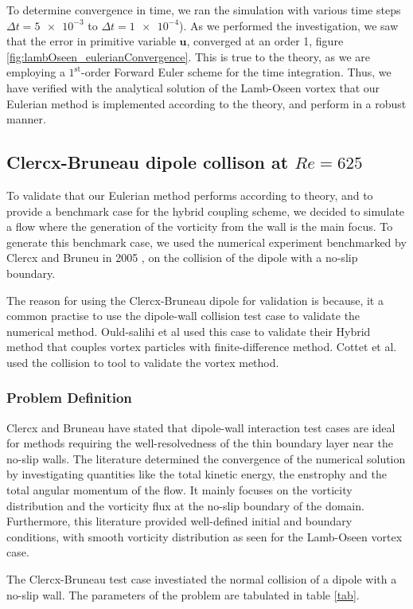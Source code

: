 To determine convergence in time, we ran the simulation with various time steps $\Delta t = \num{5e-3}$ to $\Delta t = \num{1e-4}$). As we performed the investigation, we saw that the error in primitive variable $\mathbf{u}$, converged at an order 1, figure \ref{fig:lambOseen_eulerianConvergence}. This is true to the theory, as we are employing a $1^{\mathrm{st}}$-order Forward Euler scheme for the time integration. Thus, we have verified with the analytical solution of the Lamb-Oseen vortex that our Eulerian method is implemented according to the theory, and perform in a robust manner.
	

\subsection{Clercx-Bruneau dipole collison at $Re=625$}
To validate that our Eulerian method performs according to theory, and to provide a benchmark case for the hybrid coupling scheme, we decided to simulate a flow where the generation of the vorticity from the wall is the main focus. To generate this benchmark case, we used the numerical experiment benchmarked by Clercx and Bruneu in 2005 \cite{}, on  the collision of the dipole with a no-slip boundary. 

The reason for using the Clercx-Bruneau dipole for validation is because, it a common practise to use the dipole-wall collision test case to validate the numerical method. Ould-salihi et al \cite{} used this case to validate their Hybrid method that couples vortex particles with finite-difference method. Cottet et al. \cite{} used the collision to tool to validate the vortex method.
\subsubsection*{Problem Definition}
Clercx and Bruneau have stated that dipole-wall interaction test cases are ideal for methods requiring the well-resolvedness of the thin boundary layer near the no-slip walls. The literature determined the convergence of the numerical solution by investigating quantities like the total kinetic energy, the enstrophy and the total angular momentum of the flow. It mainly focuses on the vorticity distribution and the vorticity flux at the no-slip boundary of the domain. Furthermore, this literature provided well-defined initial and boundary conditions, with smooth vorticity distribution as seen for the Lamb-Oseen vortex case.

The Clercx-Bruneau test case investiated the normal collision of a dipole with a no-slip wall. The parameters of the problem are tabulated in table \ref{tab}. 

